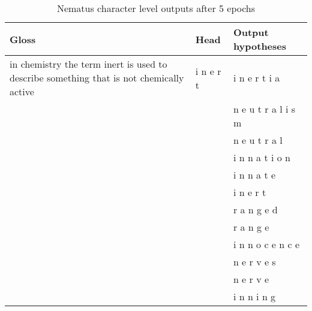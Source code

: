 \documentclass[11pt]{article}
\begin{document}
\begin{spacing}{1}
\begin{table}[!htbp]
\caption{Nematus character level outputs after 5 epochs}
\begin{tabular}{p{8cm} l l}
\toprule
Gloss                                                                                            & Head              & Output hypotheses       \\\midrule
in chemistry the term inert is used to describe something that is not chemically active          & i n e r t         & i n e r t i a           \\
                                                                                                 &                   & n e u t r a l i s m     \\
                                                                                                 &                   & n e u t r a l           \\
                                                                                                 &                   & i n n a t i o n         \\
                                                                                                 &                   & i n n a t e             \\
                                                                                                 &                   & i n e r t               \\
                                                                                                 &                   & r a n g e d             \\
                                                                                                 &                   & r a n g e               \\
                                                                                                 &                   & i n n o c e n c e       \\
                                                                                                 &                   & n e r v e s             \\
                                                                                                 &                   & n e r v e               \\
                                                                                                 &                   & i n n i n g             \\

\end{tabular}
\end{table}
\end{spacing}
\end{document}
